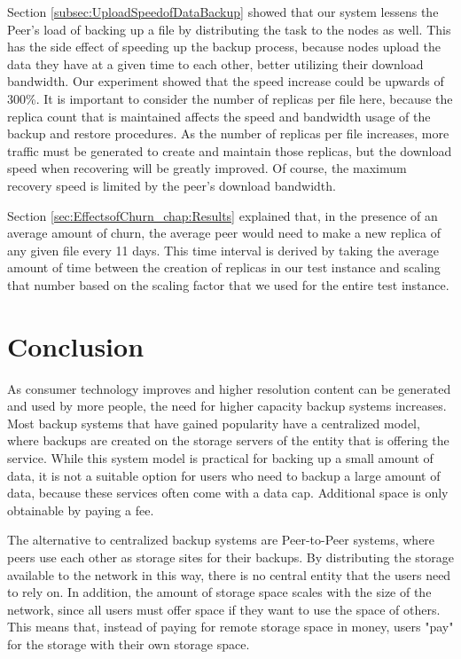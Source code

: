 \documentclass[12pt]{report}
\begin{document}
Section \ref{subsec:UploadSpeedofDataBackup} showed that our system lessens the Peer's load of backing up a file by distributing the task to the nodes as well. This has the side effect of speeding up the backup process, because nodes upload the data they have at a given time to each other, better utilizing their download bandwidth. Our experiment showed that the speed increase could be upwards of 300\%. It is important to consider the number of replicas per file here, because the replica count that is maintained affects the speed and bandwidth usage of the backup and restore procedures. As the number of replicas per file increases, more traffic must be generated to create and maintain those replicas, but the download speed when recovering will be greatly improved. Of course, the maximum recovery speed is limited by the peer's download bandwidth.

Section \ref{sec:EffectsofChurn_chap:Results} explained that, in the presence of an average amount of churn, the average peer would need to make a new replica of any given file every 11 days. This time interval is derived by taking the average amount of time between the creation of replicas in our test instance and scaling that number based on the scaling factor that we used for the entire test instance.

\chapter{Conclusion} \label{chap:Conclusion}

As consumer technology improves and higher resolution content can be generated and used by more people, the need for higher capacity backup systems increases. Most backup systems that have gained popularity have a centralized model, where backups are created on the storage servers of the entity that is offering the service. While this system model is practical for backing up a small amount of data, it is not a suitable option for users who need to backup a large amount of data, because these services often come with a data cap. Additional space is only obtainable by paying a fee.

The alternative to centralized backup systems are Peer-to-Peer systems, where peers use each other as storage sites for their backups. By distributing the storage available to the network in this way, there is no central entity that the users need to rely on. In addition, the amount of storage space scales with the size of the network, since all users must offer space if they want to use the space of others. This means that, instead of paying for remote storage space in money, users "pay" for the storage with their own storage space.
\end{document}
